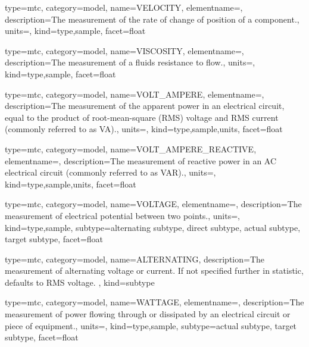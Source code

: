 {
  type=mtc,
  category=model,
  name={VELOCITY},
  elementname=,
  description={The measurement of the rate of change of position of a \gls{component}.},
  units=,
  kind={type,sample},
  facet={\gls{float}}
}


{
  type=mtc,
  category=model,
  name={VISCOSITY},
  elementname=,
  description={The measurement of a fluids resistance to flow.},
  units=,
  kind={type,sample},
  facet={\gls{float}}
}


{
  type=mtc,
  category=model,
  name={VOLT\_AMPERE},
  elementname=,
  description={The measurement of the apparent power in an electrical circuit, equal to the product of root-mean-square (RMS) voltage and RMS current (commonly referred to as VA).},
  units=,
  kind={type,sample,units},
  facet={\gls{float}}
}


{
  type=mtc,
  category=model,
  name={VOLT\_AMPERE\_REACTIVE},
  elementname=,
  description={The measurement of reactive power in an AC electrical circuit (commonly referred to as VAR).},
  units=,
  kind={type,sample,units},
  facet={\gls{float}}
}


{
  type=mtc,
  category=model,
  name={VOLTAGE},
  elementname=,
  description={The measurement of electrical potential between two points.},
  units=,
  kind={type,sample},
  subtype={\gls{alternating subtype}, \gls{direct subtype}, \gls{actual subtype}, \gls{target subtype}},
  facet={\gls{float}}
}


{
  type=mtc,
  category=model,
  name={ALTERNATING},
  description={The measurement of alternating voltage or current.   If not specified further in statistic, defaults to RMS voltage. },
  kind={subtype}
}


{
  type=mtc,
  category=model,
  name={WATTAGE},
  elementname=,
  description={The measurement of power flowing through or dissipated by an electrical circuit or piece of equipment.},
  units=,
  kind={type,sample},
  subtype={\gls{actual subtype}, \gls{target subtype}},
  facet={\gls{float}}
}


